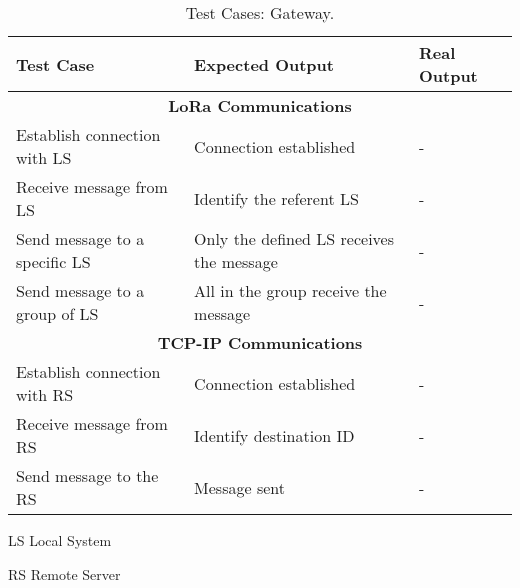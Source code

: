\begin{table}[H]
	\centering
	\begin{threeparttable}
	\resizebox{\columnwidth}{!}
	{
		\begin{tabular}{|m{4cm}|m{5cm}||m{5cm}|}
			\hline
			\textbf{Test Case} & \textbf{Expected Output} & \textbf{Real Output}
			\\\hline\hline
			\multicolumn{3}{c}{\textbf{LoRa Communications}}\\\hline
			Establish connection with LS & Connection established & -
			\\\hline
			Receive message from LS & Identify the referent LS & -
			\\\hline
			Send message to a specific LS & Only the defined LS receives the message & -
			\\\hline
			Send message to a group of LS & All in the group receive the message & - 
			\\\hline
			
			\multicolumn{3}{c}{\textbf{TCP-IP Communications}}\\\hline
			Establish connection with RS & Connection established & -
			\\\hline
			Receive message from RS & Identify destination ID & -
			\\\hline
			Send message to the RS & Message sent & -
			\\\hline
		\end{tabular}
	}
	\begin{tablenotes}
		\small
		\item[LS]Local System
		\item[RS]Remote Server
	\end{tablenotes}
	
\end{threeparttable}	
	\caption{Test Cases: Gateway.}
	\label{table:test_gateway}
\end{table}
